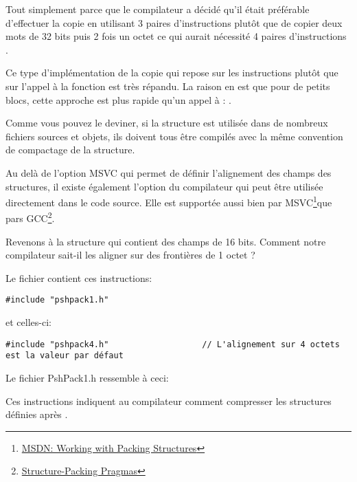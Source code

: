 Tout simplement parce que le compilateur a décidé qu'il était préférable d'effectuer la copie en utilisant 
3 paires d'instructions \MOV plutôt que de copier deux mots de 32 bits puis 2 fois un octet ce qui aurait 
nécessité 4 paires d'instructions \MOV.

Ce type d'implémentation de la copie qui repose sur les instructions \MOV plutôt que sur l'appel à la 
fonction  est très répandu. La raison en est que pour de petits blocs, cette approche est 
plus rapide qu'un appel à : .

Comme vous pouvez le deviner, si la structure est utilisée dans de nombreux fichiers sources et objets, ils 
doivent tous être compilés avec la même convention de compactage de la structure.

\newcommand{\FNURLMSDNZP}{\footnote{\href{http://go.yurichev.com/17067}
{MSDN: Working with Packing Structures}}}
\newcommand{\FNURLGCCPC}{\footnote{\href{http://go.yurichev.com/17068}
{Structure-Packing Pragmas}}}

Au delà de l'option MSVC  qui permet de définir l'alignement des champs des structures, il existe 
également l'option du compilateur  qui peut être utilisée directement dans le code source.
Elle est supportée aussi bien par MSVC\FNURLMSDNZP que pars GCC\FNURLGCCPC{}.

Revenons à la structure  qui contient des champs de 16 bits. Comment notre compilateur sait-il 
les aligner sur des frontières de 1 octet ?

Le fichier  contient ces instructions:

\begin{lstlisting}[caption=WinNT.h,style=customc]
#include "pshpack1.h"
\end{lstlisting}

et celles-ci:

\begin{lstlisting}[caption=WinNT.h,style=customc]
#include "pshpack4.h"                   // L'alignement sur 4 octets est la valeur par défaut
\end{lstlisting}

Le fichier PshPack1.h ressemble à ceci:



Ces instructions indiquent au compilateur comment compresser les structures définies après .


